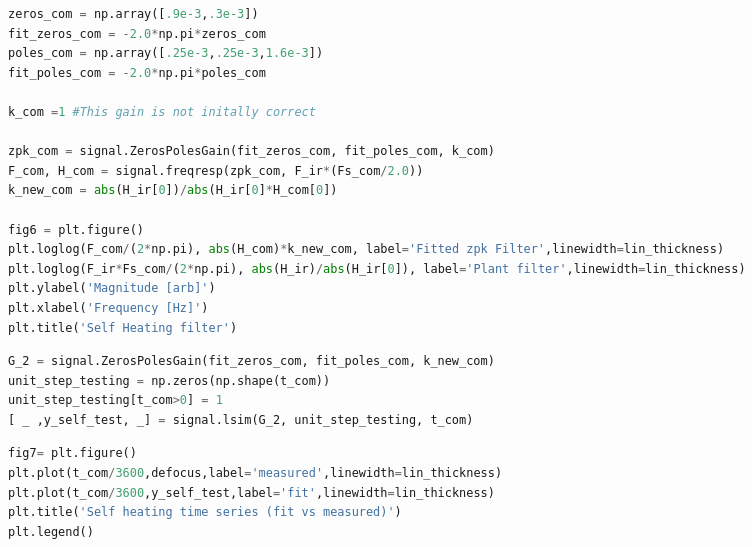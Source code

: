 \begin{spacing}{1.2} \begin{lstlisting}[frame=single,language=Python]
zeros_com = np.array([.9e-3,.3e-3])
fit_zeros_com = -2.0*np.pi*zeros_com
poles_com = np.array([.25e-3,.25e-3,1.6e-3])
fit_poles_com = -2.0*np.pi*poles_com

k_com =1 #This gain is not initally correct

zpk_com = signal.ZerosPolesGain(fit_zeros_com, fit_poles_com, k_com)
F_com, H_com = signal.freqresp(zpk_com, F_ir*(Fs_com/2.0))
k_new_com = abs(H_ir[0])/abs(H_ir[0]*H_com[0])

fig6 = plt.figure()
plt.loglog(F_com/(2*np.pi), abs(H_com)*k_new_com, label='Fitted zpk Filter',linewidth=lin_thickness)
plt.loglog(F_ir*Fs_com/(2*np.pi), abs(H_ir)/abs(H_ir[0]), label='Plant filter',linewidth=lin_thickness)
plt.ylabel('Magnitude [arb]')
plt.xlabel('Frequency [Hz]')
plt.title('Self Heating filter')
\end{lstlisting} \end{spacing}


\begin{spacing}{1.2} \begin{lstlisting}[frame=single,language=Python]
G_2 = signal.ZerosPolesGain(fit_zeros_com, fit_poles_com, k_new_com)
unit_step_testing = np.zeros(np.shape(t_com))
unit_step_testing[t_com>0] = 1
[ _ ,y_self_test, _] = signal.lsim(G_2, unit_step_testing, t_com)
\end{lstlisting} \end{spacing}

\begin{spacing}{1.2} \begin{lstlisting}[frame=single,language=Python]
fig7= plt.figure()
plt.plot(t_com/3600,defocus,label='measured',linewidth=lin_thickness)
plt.plot(t_com/3600,y_self_test,label='fit',linewidth=lin_thickness)
plt.title('Self heating time series (fit vs measured)')
plt.legend()
\end{lstlisting} \end{spacing}


